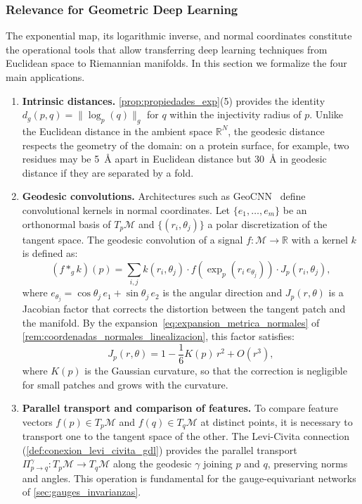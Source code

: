 \subsubsection{Relevance for Geometric Deep Learning}\label{subsec:geodesicas_relevancia_gdl}

The exponential map, its logarithmic inverse, and normal coordinates constitute the operational tools that allow transferring deep learning techniques from Euclidean space to Riemannian manifolds. In this section we formalize the four main applications.

\begin{remark}\label{rem:geodesicas_gdl}
\leavevmode
\begin{enumerate}
	\item \textbf{Intrinsic distances.} \autoref{prop:propiedades_exp}(5) provides the identity $d_g(p,q) = \|\log_p(q)\|_g$ for $q$ within the injectivity radius of $p$. Unlike the Euclidean distance in the ambient space $\mathbb{R}^N$, the geodesic distance respects the geometry of the domain: on a protein surface, for example, two residues may be 5~\AA{} apart in Euclidean distance but 30~\AA{} in geodesic distance if they are separated by a fold.

	\item \textbf{Geodesic convolutions.} Architectures such as \gls{GeoCNN}~\citep{masci2015geodesic} define convolutional kernels in normal coordinates. Let $\{e_1, \ldots, e_m\}$ be an orthonormal basis of $T_p\mathcal{M}$ and $\{(r_i, \theta_j)\}$ a polar discretization of the tangent space. The geodesic convolution of a signal $f: \mathcal{M} \to \mathbb{R}$ with a kernel $k$ is defined as:
	\begin{equation}\label{eq:convolucion_geodesica}
	(f *_g k)(p) = \sum_{i,j} k(r_i, \theta_j) \cdot f\!\left(\exp_p(r_i \, e_{\theta_j})\right) \cdot J_p(r_i, \theta_j),
	\end{equation}
	where $e_{\theta_j} = \cos\theta_j \, e_1 + \sin\theta_j \, e_2$ is the angular direction and $J_p(r, \theta)$ is a Jacobian factor that corrects the distortion between the tangent patch and the manifold. By the expansion~\eqref{eq:expansion_metrica_normales} of \autoref{rem:coordenadas_normales_linealizacion}, this factor satisfies:
	\[
	J_p(r, \theta) = 1 - \frac{1}{6} K(p) \, r^2 + O(r^3),
	\]
	where $K(p)$ is the Gaussian curvature, so that the correction is negligible for small patches and grows with the curvature.

	\item \textbf{Parallel transport and comparison of features.} To compare feature vectors $f(p) \in T_p\mathcal{M}$ and $f(q) \in T_q\mathcal{M}$ at distinct points, it is necessary to transport one to the tangent space of the other. The Levi-Civita connection (\autoref{def:conexion_levi_civita_gdl}) provides the parallel transport $\Pi_{p \to q}^{\gamma}: T_p\mathcal{M} \to T_q\mathcal{M}$ along the geodesic $\gamma$ joining $p$ and $q$, preserving norms and angles. This operation is fundamental for the gauge-equivariant networks of \autoref{sec:gauges_invarianzas}.


\end{enumerate}
\end{remark}

